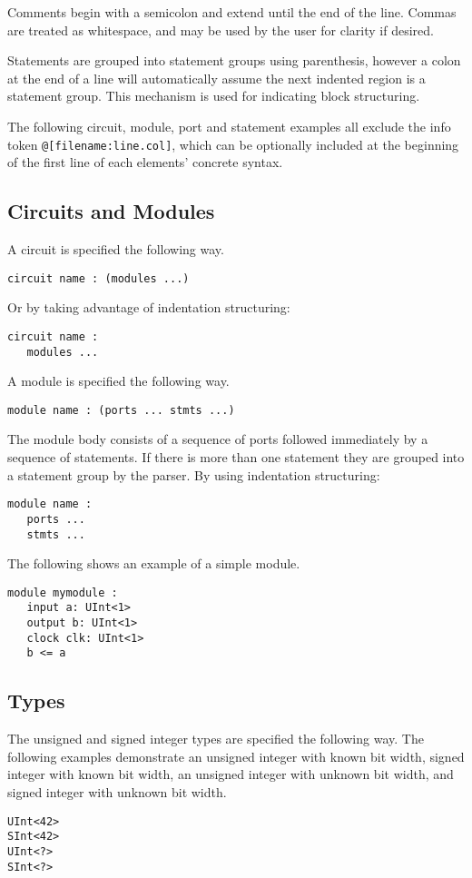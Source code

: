 \documentclass[12pt]{article}
\begin{document}
Comments begin with a semicolon and extend until the end of the line.
Commas are treated as whitespace, and may be used by the user for clarity if desired. 

Statements are grouped into statement groups using parenthesis, however a colon at the end of a line will automatically assume the next indented region is a statement group.
This mechanism is used for indicating block structuring. 

The following circuit, module, port and statement examples all exclude the info token \verb|@[filename:line.col]|, which can be optionally included at the beginning of the first line of each elements' concrete syntax.

\subsection*{Circuits and Modules}
A circuit is specified the following way.
\begin{verbatim}
circuit name : (modules ...)
\end{verbatim}
Or by taking advantage of indentation structuring:
\begin{verbatim}
circuit name :
   modules ...
\end{verbatim}

A module is specified the following way.
\begin{verbatim}
module name : (ports ... stmts ...)
\end{verbatim}
The module body consists of a sequence of ports followed immediately by a sequence of statements.
If there is more than one statement they are grouped into a statement group by the parser. 
By using indentation structuring:
\begin{verbatim}
module name :
   ports ...
   stmts ...
\end{verbatim}

The following shows an example of a simple module.
\begin{verbatim}
module mymodule :
   input a: UInt<1>
   output b: UInt<1>
   clock clk: UInt<1>
   b <= a
\end{verbatim}

\subsection*{Types}
The unsigned and signed integer types are specified the following way.
The following examples demonstrate an unsigned integer with known bit width, signed integer with known bit width, an unsigned integer with unknown bit width, and signed integer with unknown bit width.
\begin{verbatim}
UInt<42>
SInt<42>
UInt<?>
SInt<?>
\end{verbatim}
\end{document}
